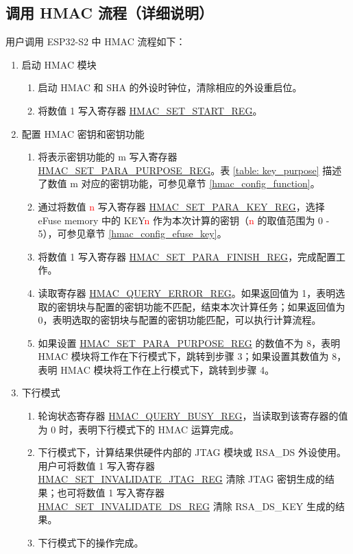 \documentclass[main\_\_CN.tex]{subfiles}
\begin{document}
\subsection{调用 HMAC 流程（详细说明）}
\label{hmac_process_detailed}
用户调用 ESP32-S2 中 HMAC 流程如下：

\begin{enumerate}
    \item 启动 HMAC 模块
    \begin{enumerate}
        \item 启动 HMAC 和 SHA 的外设时钟位，清除相应的外设重启位。
        \item 将数值 1 写入寄存器 \hyperref[regdesc:HMACSETSTARTREG]{HMAC\_SET\_START\_REG}。
    \end{enumerate}

    \item 配置 HMAC 密钥和密钥功能
        \begin{enumerate}
            \item 将表示密钥功能的 m 写入寄存器 \hyperref[regdesc:HMACSETPARAPURPOSEREG]{HMAC\_SET\_PARA\_PURPOSE\_REG}。表 \ref{table: key_purpose} 描述了数值 m 对应的密钥功能，可参见章节 \ref{hmac_config_function}。
            \item 通过将数值 \textcolor{red}{n} 写入寄存器 \hyperref[regdesc:HMACSETPARAKEYREG]{HMAC\_SET\_PARA\_KEY\_REG}，选择 eFuse memory 中的 KEY\textcolor{red}{n} 作为本次计算的密钥（\textcolor{red}{n} 的取值范围为 0 - 5），可参见章节 \ref{hmac_config_efuse_key}。
            \item 将数值 1 写入寄存器 \hyperref[regdesc:HMACSETPARAFINISHREG]{HMAC\_SET\_PARA\_FINISH\_REG}，完成配置工作。
            \item 读取寄存器 \hyperref[regdesc:HMACQUERYERRORREG]{HMAC\_QUERY\_ERROR\_REG}。如果返回值为 1，表明选取的密钥块与配置的密钥功能不匹配，结束本次计算任务；如果返回值为 0，表明选取的密钥块与配置的密钥功能匹配，可以执行计算流程。
            \item 如果设置 \hyperref[regdesc:HMACSETPARAPURPOSEREG]{HMAC\_SET\_PARA\_PURPOSE\_REG} 的数值不为 8，表明 HMAC 模块将工作在下行模式下，跳转到步骤 3；如果设置其数值为 8，表明 HMAC 模块将工作在上行模式下，跳转到步骤 4。
        \end{enumerate}

    \item 下行模式
        \begin{enumerate}
            \item 轮询状态寄存器 \hyperref[regdesc:HMACQUERYBUSYREG]{HMAC\_QUERY\_BUSY\_REG}，当读取到该寄存器的值为 0 时，表明下行模式下的 HMAC 运算完成。
            \item 下行模式下，计算结果供硬件内部的 JTAG 模块或 RSA\_DS 外设使用。用户可将数值 1 写入寄存器 \\ \hyperref[regdesc:HMACSETINVALIDATEJTAGREG]{HMAC\_SET\_INVALIDATE\_JTAG\_REG} 清除 JTAG 密钥生成的结果；也可将数值 1 写入寄存器\\ \hyperref[regdesc:HMACSETINVALIDATEDSREG]{HMAC\_SET\_INVALIDATE\_DS\_REG} 清除 RSA\_DS\_KEY 生成的结果。
            \item 下行模式下的操作完成。
        \end{enumerate}


\end{enumerate}
\end{document}

